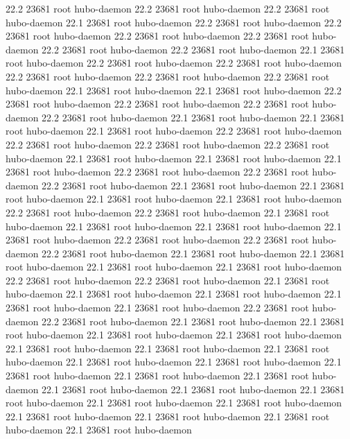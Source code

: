 22.2 23681 root     hubo-daemon
22.2 23681 root     hubo-daemon
22.2 23681 root     hubo-daemon
22.1 23681 root     hubo-daemon
22.2 23681 root     hubo-daemon
22.2 23681 root     hubo-daemon
22.2 23681 root     hubo-daemon
22.2 23681 root     hubo-daemon
22.2 23681 root     hubo-daemon
22.2 23681 root     hubo-daemon
22.1 23681 root     hubo-daemon
22.2 23681 root     hubo-daemon
22.2 23681 root     hubo-daemon
22.2 23681 root     hubo-daemon
22.2 23681 root     hubo-daemon
22.2 23681 root     hubo-daemon
22.1 23681 root     hubo-daemon
22.1 23681 root     hubo-daemon
22.2 23681 root     hubo-daemon
22.2 23681 root     hubo-daemon
22.2 23681 root     hubo-daemon
22.2 23681 root     hubo-daemon
22.1 23681 root     hubo-daemon
22.1 23681 root     hubo-daemon
22.1 23681 root     hubo-daemon
22.2 23681 root     hubo-daemon
22.2 23681 root     hubo-daemon
22.2 23681 root     hubo-daemon
22.2 23681 root     hubo-daemon
22.1 23681 root     hubo-daemon
22.1 23681 root     hubo-daemon
22.1 23681 root     hubo-daemon
22.2 23681 root     hubo-daemon
22.2 23681 root     hubo-daemon
22.2 23681 root     hubo-daemon
22.1 23681 root     hubo-daemon
22.1 23681 root     hubo-daemon
22.1 23681 root     hubo-daemon
22.1 23681 root     hubo-daemon
22.2 23681 root     hubo-daemon
22.2 23681 root     hubo-daemon
22.1 23681 root     hubo-daemon
22.1 23681 root     hubo-daemon
22.1 23681 root     hubo-daemon
22.1 23681 root     hubo-daemon
22.2 23681 root     hubo-daemon
22.2 23681 root     hubo-daemon
22.2 23681 root     hubo-daemon
22.1 23681 root     hubo-daemon
22.1 23681 root     hubo-daemon
22.1 23681 root     hubo-daemon
22.1 23681 root     hubo-daemon
22.2 23681 root     hubo-daemon
22.2 23681 root     hubo-daemon
22.1 23681 root     hubo-daemon
22.1 23681 root     hubo-daemon
22.1 23681 root     hubo-daemon
22.1 23681 root     hubo-daemon
22.1 23681 root     hubo-daemon
22.2 23681 root     hubo-daemon
22.2 23681 root     hubo-daemon
22.1 23681 root     hubo-daemon
22.1 23681 root     hubo-daemon
22.1 23681 root     hubo-daemon
22.1 23681 root     hubo-daemon
22.1 23681 root     hubo-daemon
22.1 23681 root     hubo-daemon
22.1 23681 root     hubo-daemon
22.1 23681 root     hubo-daemon
22.1 23681 root     hubo-daemon
22.1 23681 root     hubo-daemon
22.1 23681 root     hubo-daemon
22.1 23681 root     hubo-daemon
22.1 23681 root     hubo-daemon
22.1 23681 root     hubo-daemon
22.1 23681 root     hubo-daemon
22.1 23681 root     hubo-daemon
22.1 23681 root     hubo-daemon
22.1 23681 root     hubo-daemon
22.1 23681 root     hubo-daemon
22.1 23681 root     hubo-daemon
22.1 23681 root     hubo-daemon
